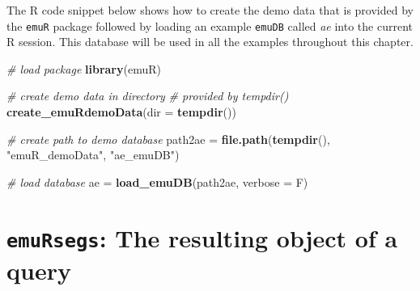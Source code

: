 \documentclass[]{book}
\newenvironment{Shaded}{\begin{snugshade}}{\end{snugshade}}
\newcommand{\CommentTok}[1]{\textcolor[rgb]{0.56,0.35,0.01}{\textit{#1}}}
\newcommand{\DataTypeTok}[1]{\textcolor[rgb]{0.13,0.29,0.53}{#1}}
\newcommand{\KeywordTok}[1]{\textcolor[rgb]{0.13,0.29,0.53}{\textbf{#1}}}
\newcommand{\NormalTok}[1]{#1}
\newcommand{\StringTok}[1]{\textcolor[rgb]{0.31,0.60,0.02}{#1}}
\begin{document}
The R code snippet below shows how to create the demo data that is provided by the \texttt{emuR} package followed by loading an example \texttt{emuDB} called \emph{ae} into the current R session. This database will be used in all the examples throughout this chapter.

\begin{Shaded}
\begin{Highlighting}[]
\CommentTok{# load package}
\KeywordTok{library}\NormalTok{(emuR)}

\CommentTok{# create demo data in directory}
\CommentTok{# provided by tempdir()}
\KeywordTok{create_emuRdemoData}\NormalTok{(}\DataTypeTok{dir =} \KeywordTok{tempdir}\NormalTok{())}

\CommentTok{# create path to demo database}
\NormalTok{path2ae =}\StringTok{ }\KeywordTok{file.path}\NormalTok{(}\KeywordTok{tempdir}\NormalTok{(), }\StringTok{"emuR_demoData"}\NormalTok{, }\StringTok{"ae_emuDB"}\NormalTok{)}

\CommentTok{# load database}
\NormalTok{ae =}\StringTok{ }\KeywordTok{load_emuDB}\NormalTok{(path2ae, }\DataTypeTok{verbose =}\NormalTok{ F)}
\end{Highlighting}
\end{Shaded}

\hypertarget{sec:query-emuRsegs}{%
\section{\texorpdfstring{\texttt{emuRsegs}: The resulting object of a query}{emuRsegs: The resulting object of a query}}\label{sec:query-emuRsegs}}
\end{document}
